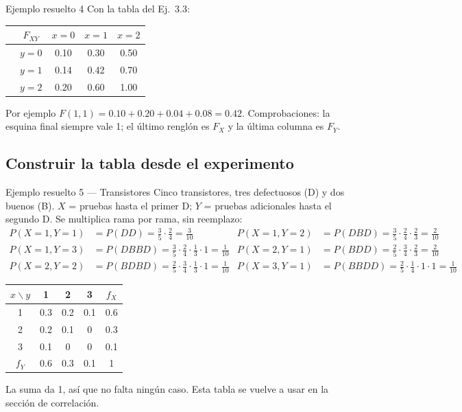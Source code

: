 \begin{ejemplo}{Ejemplo resuelto 4 }
Con la tabla del Ej.~3.3:
\begin{center}
\begin{tabular}{cc|ccc}
 & $F_{XY}$ & $x=0$ & $x=1$ & $x=2$\\ \hline
 & $y=0$ & 0.10 & 0.30 & 0.50\\
 & $y=1$ & 0.14 & 0.42 & 0.70\\
 & $y=2$ & 0.20 & 0.60 & 1.00
\end{tabular}
\end{center}
Por ejemplo $F(1,1)=0.10+0.20+0.04+0.08=0.42$. Comprobaciones: la esquina final siempre vale 1; el \'ultimo
rengl\'on es $F_X$ y la \'ultima columna es $F_Y$.
\end{ejemplo}

\subsection{Construir la tabla desde el experimento}

\begin{ejemplo}{Ejemplo resuelto 5 --- Transistores }
Cinco transistores, tres defectuosos (D) y dos buenos (B). $X$ = pruebas hasta el primer D;
$Y$ = pruebas adicionales hasta el segundo D. Se multiplica rama por rama, sin reemplazo:
{\small\begin{align*}
P(X=1,Y=1)&=P(DD)=\tfrac35\cdot\tfrac24=\tfrac{3}{10} &
P(X=1,Y=2)&=P(DBD)=\tfrac35\cdot\tfrac24\cdot\tfrac23=\tfrac{2}{10}\\
P(X=1,Y=3)&=P(DBBD)=\tfrac35\cdot\tfrac24\cdot\tfrac13\cdot1=\tfrac{1}{10} &
P(X=2,Y=1)&=P(BDD)=\tfrac25\cdot\tfrac34\cdot\tfrac23=\tfrac{2}{10}\\
P(X=2,Y=2)&=P(BDBD)=\tfrac25\cdot\tfrac34\cdot\tfrac13\cdot1=\tfrac{1}{10} &
P(X=3,Y=1)&=P(BBDD)=\tfrac25\cdot\tfrac14\cdot1\cdot1=\tfrac{1}{10}
\end{align*}}
\begin{center}
\begin{tabular}{c|ccc|c}
$x\backslash y$ & 1 & 2 & 3 & $f_X$\\ \hline
1 & 0.3 & 0.2 & 0.1 & 0.6\\
2 & 0.2 & 0.1 & 0 & 0.3\\
3 & 0.1 & 0 & 0 & 0.1\\ \hline
$f_Y$ & 0.6 & 0.3 & 0.1 & 1
\end{tabular}
\end{center}
La suma da 1, as\'i que no falta ning\'un caso. Esta tabla se vuelve a usar en la secci\'on de correlaci\'on.
\end{ejemplo}
